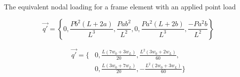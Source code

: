 The equivalent nodal loading for a frame element with an applied point load

\begin{equation}
	\vec{q'} = \left\{ 
	0,
	\frac{Pb^2(L+2a)}{L^3},
	\frac{Pab^2}{L^2},
	0,
	\frac{Pa^2(L+2b)}{L^3},
	\frac{-Pa^2b}{L^2}
	\right\}
\end{equation}


\begin{equation}
	\begin{split}
	\vec{q'} = \Bigg\{ 
	&0,
	\frac{L(7w_0+3w_L)}{20},
	\frac{L^2(3w_0+2w_L)}{60}, \\
	&0,
	\frac{L(3w_0+7w_L)}{20},
	-\frac{L^2(2w_0+3w_L)}{60}
	\Bigg\}
	\end{split}
\end{equation}


\begin{figure}[h]
\begin{center}
\end{center}
\end{figure}




\begin{figure}[h]
\begin{center}
\end{center}
\end{figure}










